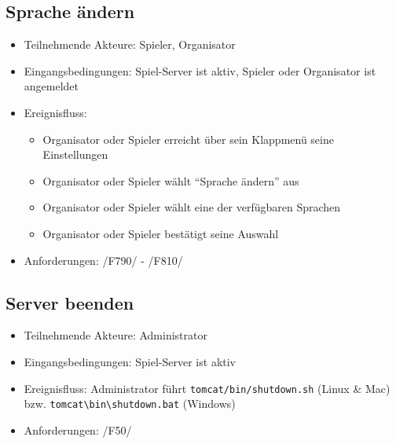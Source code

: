 \documentclass[a4paper]{scrreprt}
\begin{document}
    \subsection{Sprache ändern}
    \begin{itemize}
    \item Teilnehmende Akteure: \Gls{Spieler}, \Gls{Organisator}
    \item Eingangsbedingungen: \Gls{Spiel-Server} ist aktiv, \Gls{Spieler} oder \Gls{Organisator} ist angemeldet
    \item Ereignisfluss:
        \begin{itemize}
            \item \Gls{Organisator} oder \Gls{Spieler} erreicht über sein Klappmenü seine Einstellungen
            \item \Gls{Organisator} oder \Gls{Spieler} wählt \enquote{Sprache ändern} aus
            \item \Gls{Organisator} oder \Gls{Spieler} wählt eine der verfügbaren Sprachen
            \item \Gls{Organisator} oder \Gls{Spieler} bestätigt seine Auswahl
        \end{itemize}
        \item Anforderungen: /F790/ - /F810/
    \end{itemize}

    \subsection{Server beenden}
    \begin{itemize}
        \item Teilnehmende Akteure: \Gls{Administrator}
        \item Eingangsbedingungen: \Gls{Spiel-Server} ist aktiv
        \item Ereignisfluss: \Gls{Administrator} führt \texttt{tomcat/bin/shutdown.sh} (Linux \& Mac) bzw.  \texttt{tomcat\textbackslash bin\textbackslash shutdown.bat} (Windows)
        \item Anforderungen: /F50/
    \end{itemize}
\end{document}
